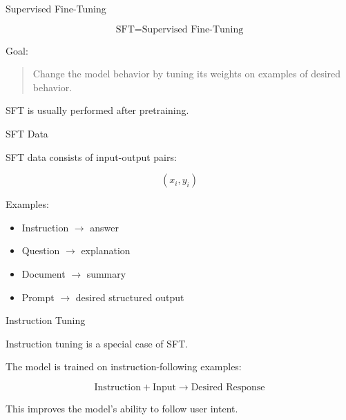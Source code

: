 \documentclass[aspectratio=169]{beamer}
\begin{document}
\begin{frame}{Supervised Fine-Tuning}

\[
\text{SFT} = \text{Supervised Fine-Tuning}
\]

\vspace{0.5cm}

Goal:

\begin{quote}
Change the model behavior by tuning its weights on examples of desired behavior.
\end{quote}

\vspace{0.5cm}

SFT is usually performed after pretraining.

\end{frame}

\begin{frame}{SFT Data}

SFT data consists of input-output pairs:

\[
(x_i, y_i)
\]

\vspace{0.5cm}

Examples:

\begin{itemize}
    \item Instruction $\rightarrow$ answer
    \item Question $\rightarrow$ explanation
    \item Document $\rightarrow$ summary
    \item Prompt $\rightarrow$ desired structured output
\end{itemize}

\end{frame}

\begin{frame}{Instruction Tuning}

Instruction tuning is a special case of SFT.

\vspace{0.5cm}

The model is trained on instruction-following examples:

\[
\text{Instruction}
+
\text{Input}
\rightarrow
\text{Desired Response}
\]

\vspace{0.5cm}

This improves the model's ability to follow user intent.

\end{frame}
\end{document}
